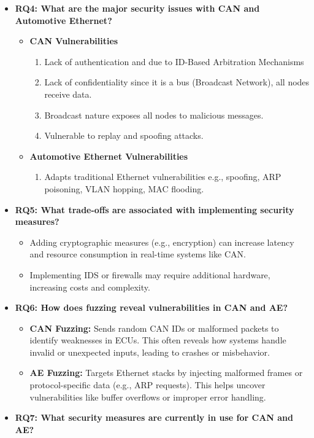 \documentclass{report}
\begin{document}
\begin{itemize}
    \item \textbf{RQ4: What are the major security issues with CAN and Automotive Ethernet?}
        \begin{itemize}
            \item \textbf{CAN Vulnerabilities}
            \begin{enumerate}
                \item Lack of authentication and due to ID-Based Arbitration Mechanisms
                \item Lack of confidentiality since it is a bus (Broadcast Network), all nodes receive data.
                \item Broadcast nature exposes all nodes to malicious messages.
                \item Vulnerable to replay and spoofing attacks.
            \end{enumerate}
        
            \item \textbf{Automotive Ethernet Vulnerabilities}
            \begin{enumerate}
                \item Adapts traditional Ethernet vulnerabilities e.g., spoofing, ARP poisoning, VLAN hopping, MAC flooding.
            \end{enumerate}
        \end{itemize}
        
    \item \textbf{RQ5: What trade-offs are associated with implementing security measures?}
        \begin{itemize}
            \item Adding cryptographic measures (e.g., encryption) can increase latency and resource consumption in real-time systems like CAN.
            \item Implementing IDS or firewalls may require additional hardware, increasing costs and complexity.
        \end{itemize}
        
    \item \textbf{RQ6: How does fuzzing reveal vulnerabilities in CAN and AE?}
        \begin{itemize}
            \item \textbf{CAN Fuzzing:} Sends random CAN IDs or malformed packets to identify weaknesses in ECUs. This often reveals how systems handle invalid or unexpected inputs, leading to crashes or misbehavior.
            \item \textbf{AE Fuzzing:} Targets Ethernet stacks by injecting malformed frames or protocol-specific data (e.g., ARP requests). This helps uncover vulnerabilities like buffer overflows or improper error handling.
        \end{itemize}
        
    \item \textbf{RQ7: What security measures are currently in use for CAN and AE?}    
\end{itemize}
\end{document}
